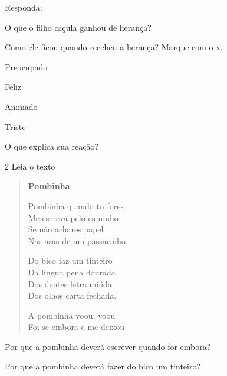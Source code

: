 
Responda:

\begin{escolha}
\item O que o filho caçula ganhou de herança?


\item Como ele ficou quando recebeu a herança? Marque com o x.

\begin{boxlist}
\boxitem[] Preocupado

\boxitem[] Feliz

\boxitem[] Animado

\boxitem[] Triste
\end{boxlist}

\item O que explica sua reação?

\end{escolha}

\num{2} Leia o texto

\begin{verse}
\textbf{Pombinha}

Pombinha quando tu fores\\
Me escreva pelo caminho\\
Se não achares papel\\
Nas asas de um passarinho.

Do bico faz um tinteiro\\
Da língua pena dourada\\
Dos dentes letra miúda\\
Dos olhos carta fechada.

A pombinha voou, voou\\
Foi-se embora e me deixou
\end{verse}


\begin{escolha}
\item Por que a pombinha deverá escrever quando for embora?


\item Por que a pombinha deverá fazer do bico um tinteiro?

\end{escolha}

